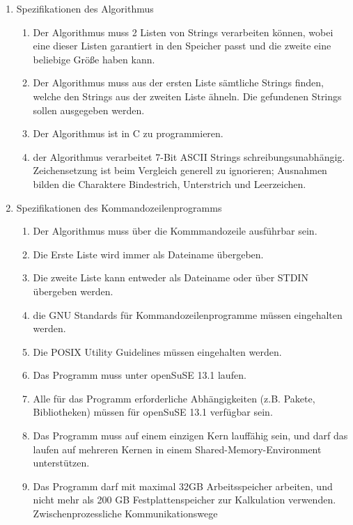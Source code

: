 \begin{enumerate}
    \item Spezifikationen des Algorithmus
        \begin{enumerate}
            \item Der Algorithmus muss 2 Listen von Strings verarbeiten können,
            wobei eine dieser Listen garantiert in den Speicher passt und die zweite
            eine beliebige Größe haben kann.
            \item Der Algorithmus muss aus der ersten Liste sämtliche Strings finden,
            welche den Strings aus der zweiten Liste ähneln. Die gefundenen Strings
            sollen ausgegeben werden.
            \item Der Algorithmus ist in C zu programmieren.
            \item der Algorithmus verarbeitet 7-Bit ASCII Strings schreibungsunabhängig. Zeichensetzung
            ist beim Vergleich generell zu ignorieren; Ausnahmen bilden die
            Charaktere Bindestrich, Unterstrich und Leerzeichen.
        \end{enumerate}
    \item Spezifikationen des Kommandozeilenprogramms
        \begin{enumerate}
            \item Der Algorithmus muss über die Kommmandozeile ausführbar sein.
            \item Die Erste Liste wird immer als Dateiname übergeben.
            \item Die zweite Liste kann entweder als Dateiname oder über STDIN übergeben werden.
            \item die GNU Standards für Kommandozeilenprogramme müssen eingehalten werden.
            \item Die POSIX Utility Guidelines müssen eingehalten werden.
            \item Das Programm muss unter openSuSE 13.1 laufen.
            \item Alle für das Programm erforderliche Abhängigkeiten
            (z.B. Pakete, Bibliotheken) müssen für openSuSE 13.1 verfügbar sein.
            \item Das Programm muss auf einem einzigen Kern lauffähig sein, und
            darf das laufen auf mehreren Kernen in einem Shared-Memory-Environment
            unterstützen.
            \item Das Programm darf mit maximal 32GB Arbeitsspeicher arbeiten, und nicht mehr
            als 200 GB Festplattenspeicher zur Kalkulation verwenden. Zwischenprozessliche Kommunikationswege

\end{enumerate}
\end{enumerate}
